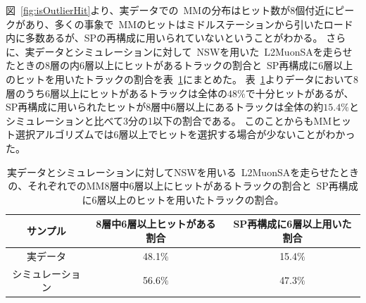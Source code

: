 図~\ref{fig:isOutlierHit}より、実データでの~MMの分布はヒット数が8個付近にピークがあり、多くの事象で~MMのヒットはミドルステーションから引いたロード内に多数あるが、SPの再構成に用いられていないということがわかる。
さらに、実データとシミュレーションに対して~NSWを用いた~L2MuonSAを走らせたときの8層の内6層以上にヒットがあるトラックの割合と~SP再構成に6層以上のヒットを用いたトラックの割合を表~\ref{tab:numOfMMhits}にまとめた。
表~\ref{tab:numOfMMhits}よりデータにおいて8層のうち6層以上にヒットがあるトラックは全体の$48\%$で十分ヒットがあるが、SP再構成に用いられたヒットが8層中6層以上にあるトラックは全体の約$15.4\%$とシミュレーションと比べて3分の1以下の割合である。
このことからもMMヒット選択アルゴリズムでは6層以上でヒットを選択する場合が少ないことがわかった。

\begin{table}[h]
    \centering
    \begin{tabular}{|c|c|c|}\hline
         サンプル & 8層中6層以上ヒットがある割合 & SP再構成に6層以上用いた割合  \\ \hline
         実データ & 48.1$\%$ & 15.4$\%$ \\ \hline
         シミュレーション & 56.6$\%$ & 47.3$\%$ \\ \hline
    \end{tabular}
    \caption{実データとシミュレーションに対してNSWを用いる~L2MuonSAを走らせたときの、それぞれでのMM8層中6層以上にヒットがあるトラックの割合と~SP再構成に6層以上のヒットを用いたトラックの割合。}
    \label{tab:numOfMMhits}
\end{table}


